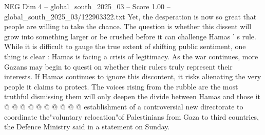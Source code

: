 \begin{textsample}{NEG Dim 4 – global\_south\_2025\_03 – Score 1.00 – global\_south\_2025\_03/122903322.txt}
Yet, the desperation is now so great that people are willing to take the chance.
The question is whether this dissent will grow into something larger or be crushed before it can challenge Hamas ' s rule.
While it is difficult to gauge the true extent of shifting public sentiment, one thing is clear : Hamas is facing a crisis of legitimacy.
As the war continues, more Gazans may begin to questi on whether their rulers truly represent their interests.
If Hamas continues to ignore this discontent, it risks alienating the very people it claims to protect.
The voices rising from the rubble are the most truthful dismissing them will only deepen the divide between Hamas and those it @ @ @ @ @ @ @ @ @ @ establishment of a controversial new directorate to coordinate the"voluntary relocation"of Palestinians from Gaza to third countries, the Defence Ministry said in a statement on Sunday.

\end{textsample}
